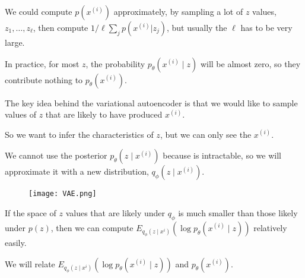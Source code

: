 \documentclass[t]{beamer}
\begin{document}
\begin{frame}
  We could compute $p(x^{(i)})$ approximately, by sampling a
  lot of $z$ values, $z_1, \dots, z_\ell$, then compute $1/\ell
  \sum_j p(x^{(i)}| z_j) $, but usually the $\ell$ has to be
  very large.

  \vspace{2.5mm}

  
  In practice, for most $z$, the probability
  $p_{\theta}(x^{(i)}\mid z)$ will be almost zero, so they
  contribute nothing to $p_\theta(x^{(i)})$.

  \vspace{2.5mm}

  
  The key idea behind the variational autoencoder is that we
  would like to sample values of $z$ that are likely to have
  produced $x^{(i)}$.

  \vspace{2.5mm}

  So we want to infer the characteristics of $z$, but we can
  only see the $x^{(i)}$.

  \vspace{2.5mm}
  
  We cannot use the posterior $p_{\theta}(z\mid x^{(i)})$
  because is intractable, so we will approximate it with a
  new distribution, $q_{\phi}(z\mid x^{(i)})$.
 \end{frame}

\begin{frame}
  
  \begin{figure}
    \texttt{[image: VAE.png]}
  \end{figure}

  \vspace{2mm}

  If the space of $z$ values that are likely under
  $q_{\phi}$ is much smaller than those likely under $p(z)$,
  then we can compute
  $E_{q_{\phi}(z\mid x^{i})}(\log p_{\theta}(x^{(i)}\mid
  z))$ relatively easily.

  \vspace{2mm}

  We will relate
  $E_{q_{\phi}(z\mid x^{i})}(\log p_{\theta}(x^{(i)}\mid
  z))$ and $p_{\theta}(x^{(i)})$.
  
\end{frame}
\end{document}

